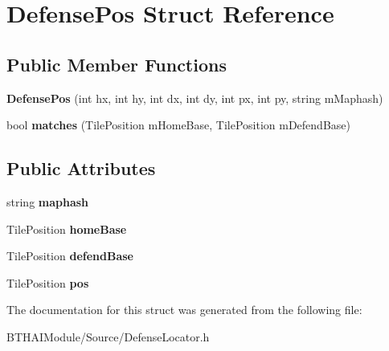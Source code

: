 \hypertarget{struct_defense_pos}{\section{Defense\-Pos Struct Reference}
\label{struct_defense_pos}
}
\subsection*{Public Member Functions}
\begin{DoxyCompactItemize}
\item 
\hypertarget{struct_defense_pos_aa735e57db8febab58ea4513fba9c4c5b}{{\bfseries Defense\-Pos} (int hx, int hy, int dx, int dy, int px, int py, string m\-Maphash)}\label{struct_defense_pos_aa735e57db8febab58ea4513fba9c4c5b}

\item 
\hypertarget{struct_defense_pos_a71a4a741d1810d83d24e5887462f1535}{bool {\bfseries matches} (Tile\-Position m\-Home\-Base, Tile\-Position m\-Defend\-Base)}\label{struct_defense_pos_a71a4a741d1810d83d24e5887462f1535}

\end{DoxyCompactItemize}
\subsection*{Public Attributes}
\begin{DoxyCompactItemize}
\item 
\hypertarget{struct_defense_pos_a55311c864dcb9690bd5c9023793db74b}{string {\bfseries maphash}}\label{struct_defense_pos_a55311c864dcb9690bd5c9023793db74b}

\item 
\hypertarget{struct_defense_pos_a58afdac1d341a14bf75e91dcec17c660}{Tile\-Position {\bfseries home\-Base}}\label{struct_defense_pos_a58afdac1d341a14bf75e91dcec17c660}

\item 
\hypertarget{struct_defense_pos_a8e4417dd7f1d00dd6361c03124aff184}{Tile\-Position {\bfseries defend\-Base}}\label{struct_defense_pos_a8e4417dd7f1d00dd6361c03124aff184}

\item 
\hypertarget{struct_defense_pos_a23f03ba800f1a2b70cb92fadc6eca695}{Tile\-Position {\bfseries pos}}\label{struct_defense_pos_a23f03ba800f1a2b70cb92fadc6eca695}

\end{DoxyCompactItemize}


The documentation for this struct was generated from the following file\-:\begin{DoxyCompactItemize}
\item 
B\-T\-H\-A\-I\-Module/\-Source/Defense\-Locator.\-h\end{DoxyCompactItemize}
